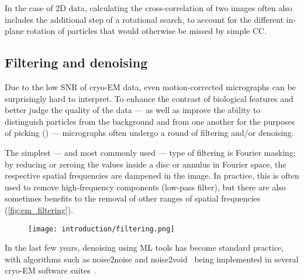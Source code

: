 In the case of 2D data, calculating the cross-correlation of two images often also includes the additional step of a rotational search, to account for the different in-plane rotation of particles that would otherwise be missed by simple CC.

\subsection{Filtering and denoising}\label{em_filtering_and_denoising}

Due to the low SNR of cryo-EM data, even motion-corrected micrographs can be surprisingly hard to interpret.
To enhance the contrast of biological features and better judge the quality of the data --- as well as improve the ability to distinguish particles from the background and from one another for the purposes of picking () --- micrographs often undergo a round of filtering and/or denoising.

The simplest --- and most commonly used --- type of filtering is Fourier masking; by reducing or zeroing the values inside a disc or annulus in Fourier space, the respective spatial frequencies are dampened in the image.
In practice, this is often used to remove high-frequency components (low-pass filter), but there are also sometimes benefits to the removal of other ranges of spatial frequencies (\autoref{fig:em_filtering}).

\begin{figure}[ht]
    \centering
    \texttt{[image: introduction/filtering.png]}
    \label{fig:em_filtering}
\end{figure}

In the last few years, denoising using ML tools has become standard practice, with algorithms such as noise2noise and noise2void~\cite{lehtinenNoise2NoiseLearningImage2018,krullNoise2VoidLearningDenoising2019} being implemented in several cryo-EM software suites~\cite{beplerTopazDenoiseGeneralDeep2020,tegunovRealtimeCryoelectronMicroscopy2019,buchholzCryoCAREContentAwareImage2018}.

